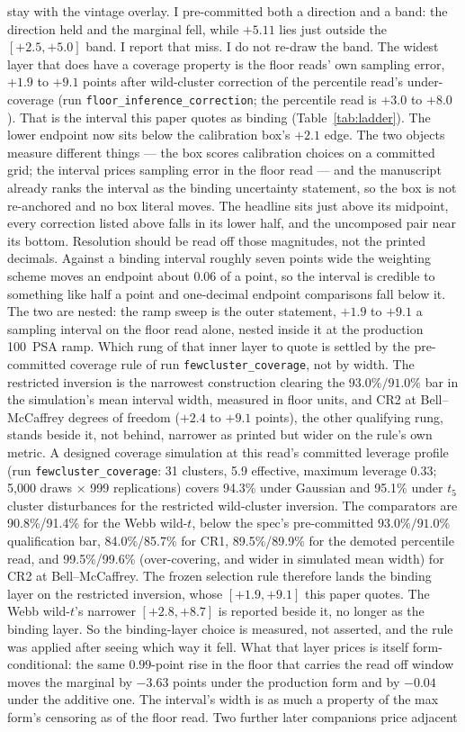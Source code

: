 \documentclass[12pt]{article}
\begin{document}
stay with the vintage overlay. I pre-committed both a direction and a band: the direction held and the marginal fell, while $+5.11$ lies just outside the $[+2.5, +5.0]$ band. I report that miss. I do not re-draw the band. The widest layer that does have a coverage property is the floor reads' own sampling error, $+1.9$ to $+9.1$ points after wild-cluster correction of the percentile read's under-coverage (run \texttt{floor\_inference\_correction}; the percentile read is $+3.0$ to $+8.0$). That is the interval this paper quotes as binding (Table~\ref{tab:ladder}). The lower endpoint now sits below the calibration box's $+2.1$ edge. The two objects measure different things --- the box scores calibration choices on a committed grid; the interval prices sampling error in the floor read --- and the manuscript already ranks the interval as the binding uncertainty statement, so the box is not re-anchored and no box literal moves. The headline sits just above its midpoint, every correction listed above falls in its lower half, and the uncomposed pair near its bottom. Resolution should be read off those magnitudes, not the printed decimals. Against a binding interval roughly seven points wide the weighting scheme moves an endpoint about $0.06$ of a point, so the interval is credible to something like half a point and one-decimal endpoint comparisons fall below it. The two are nested: the ramp sweep is the outer statement, $+1.9$ to $+9.1$ a sampling interval on the floor read alone, nested inside it at the production 100~PSA ramp. Which rung of that inner layer to quote is settled by the pre-committed coverage rule of run \texttt{fewcluster\_coverage}, not by width. The restricted inversion is the narrowest construction clearing the $93.0\%/91.0\%$ bar in the simulation's mean interval width, measured in floor units, and CR2 at Bell--McCaffrey degrees of freedom ($+2.4$ to $+9.1$ points), the other qualifying rung, stands beside it, not behind, narrower as printed but wider on the rule's own metric. A designed coverage simulation at this read's committed leverage profile (run \texttt{fewcluster\_coverage}: 31 clusters, 5.9 effective, maximum leverage 0.33; 5{,}000 draws $\times$ 999 replications) covers 94.3\% under Gaussian and 95.1\% under $t_5$ cluster disturbances for the restricted wild-cluster inversion. The comparators are 90.8\%/91.4\% for the Webb wild-$t$, below the spec's pre-committed $93.0\%/91.0\%$ qualification bar, 84.0\%/85.7\% for CR1, 89.5\%/89.9\% for the demoted percentile read, and 99.5\%/99.6\% (over-covering, and wider in simulated mean width) for CR2 at Bell--McCaffrey. The frozen selection rule therefore lands the binding layer on the restricted inversion, whose $[+1.9, +9.1]$ this paper quotes. The Webb wild-$t$'s narrower $[+2.8, +8.7]$ is reported beside it, no longer as the binding layer. So the binding-layer choice is measured, not asserted, and the rule was applied after seeing which way it fell. What that layer prices is itself form-conditional: the same $0.99$-point rise in the floor that carries the read off window moves the marginal by $-3.63$ points under the production form and by $-0.04$ under the additive one. The interval's width is as much a property of the max form's censoring as of the floor read. Two further later companions price adjacent 
\end{document}
